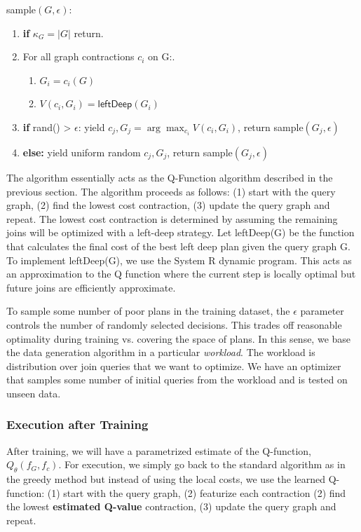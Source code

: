 \textsf{sample}$(G, \epsilon)$:
\begin{enumerate}
    \item \textbf{if} $\kappa_G = |G|$ return.
    \item For all graph contractions $c_i$ on G:.
    \begin{enumerate}
    \item $G_i = c_i(G)$  
    \item $V(c_i, G_i) = \textsf{leftDeep}(G_i)$
    \end{enumerate}
    \item \textbf{if} \textsf{rand()} > $\epsilon$: yield $c_j, G_j = \arg\max_{c_i} V(c_i,G_i)$, return \textsf{sample}$(G_j,\epsilon)$
    \item \textbf{else: } yield uniform random $c_j, G_j $, return \textsf{sample}$(G_j,\epsilon)$
\end{enumerate}

The algorithm essentially acts as the Q-Function algorithm described in the previous section. The algorithm proceeds as follows: (1) start with the query graph, (2) find the lowest cost contraction, (3) update the query graph and repeat. The lowest cost contraction is determined by assuming the remaining joins will be optimized with a left-deep strategy.
Let \textsf{leftDeep}(G) be the function that calculates the final cost of the best left deep plan given the query graph G.
To implement \textsf{leftDeep}(G), we use the System R dynamic program. 
This acts as an approximation to the Q function where the current step is locally optimal but future joins are efficiently approximate.

To sample some number of poor plans in the training dataset, the $\epsilon$ parameter controls the number of randomly selected decisions.
This trades off reasonable optimality during training vs. covering the space of plans.
In this sense, we base the data generation algorithm in a particular \emph{workload}. The workload is distribution over join queries that we want to optimize. 
We have an optimizer that samples some number of initial queries from the workload and is tested on unseen data.

\subsubsection{Execution after Training}
After training, we will have a parametrized estimate of the Q-function, $Q_\theta(f_G,f_c)$. For execution, we simply go back to the standard algorithm as in the greedy method but instead of using the local costs, we use the learned Q-function: (1) start with the query graph, (2) featurize each contraction (2) find the lowest \textbf{estimated Q-value} contraction, (3) update the query graph and repeat.

